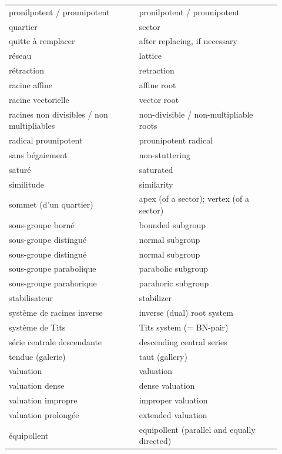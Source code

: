 \documentclass[12pt,a4paper,oneside,english]{smfart}
\theoremstyle{definition}
\theoremstyle{bt}
\begin{document}
\begin{longtable}{@{}p{0.44\linewidth}p{0.48\linewidth}@{}}
pronilpotent / prounipotent & pronilpotent / prounipotent\\
quartier & sector\\
quitte à remplacer & after replacing, if necessary\\
r\'eseau & lattice\\
r\'etraction & retraction\\
racine affine & affine root\\
racine vectorielle & vector root\\
racines non divisibles / non multipliables & non-divisible / non-multipliable roots\\
radical prounipotent & prounipotent radical\\
sans b\'egaiement & non-stuttering\\
satur\'e & saturated\\
similitude & similarity\\
sommet (d'un quartier) & apex (of a sector); vertex (of a sector)\\
sous-groupe born\'e & bounded subgroup\\
sous-groupe distingu\'e & normal subgroup\\
sous-groupe distingué & normal subgroup\\
sous-groupe parabolique & parabolic subgroup\\
sous-groupe parahorique & parahoric subgroup\\
stabilisateur & stabilizer\\
syst\`eme de racines inverse & inverse (dual) root system\\
syst\`eme de Tits & Tits system (= BN-pair)\\
série centrale descendante & descending central series\\
tendue (galerie) & taut (gallery)\\
valuation & valuation\\
valuation dense & dense valuation\\
valuation impropre & improper valuation\\
valuation prolongée & extended valuation\\
équipollent & equipollent (parallel and equally directed)\\
\end{longtable}
\normalsize
\end{document}
